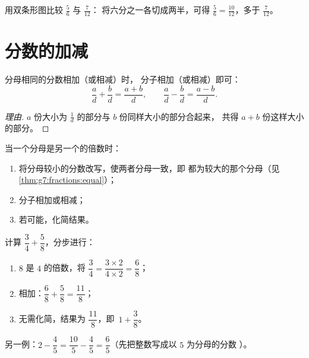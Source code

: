 \begin{omfigure}

{\small 用双条形图比较 $\frac56$ 与 $\frac{7}{12}$：
将六分之一各切成两半，可得 $\frac56 = \frac{10}{12}$，多于
$\frac{7}{12}$。}
\end{omfigure}

\section{分数的加减}

\begin{theorem}[同分母分数的加减]\label{thm:g7:fractions:add}
分母相同的分数相加（或相减）时，
分子相加（或相减）即可：
\[
\frac{a}{d} + \frac{b}{d} = \frac{a + b}{d},
\qquad
\frac{a}{d} - \frac{b}{d} = \frac{a - b}{d} .
\]
\end{theorem}

\begin{proof}[理由]
$a$ 份大小为 $\frac1d$ 的部分与 $b$ 份同样大小的部分合起来，
共得 $a + b$ 份这样大小的部分。
\end{proof}

\begin{method}[分母不同的分数加减]\label{met:g7:fractions:add}
当一个分母是另一个的倍数时：
\begin{enumerate}
  \item 将分母较小的分数改写，使两者分母一致，即
        都为较大的那个分母（见\cref{thm:g7:fractions:equal}）；
  \item 分子相加或相减；
  \item 若可能，化简结果。
\end{enumerate}
\end{method}

\begin{example}\label{ex:g7:fractions:add}
计算 $\dfrac{3}{4} + \dfrac{5}{8}$，分步进行：
\begin{enumerate}
  \item $8$ 是 $4$ 的倍数，将
        $\dfrac34 = \dfrac{3 \times 2}{4 \times 2} = \dfrac{6}{8}$；
  \item 相加：$\dfrac{6}{8} + \dfrac{5}{8} = \dfrac{11}{8}$；
  \item 无需化简，结果为 $\dfrac{11}{8}$，即\
        $1 + \dfrac38$。
\end{enumerate}
另一例：$2 - \dfrac{4}{5} = \dfrac{10}{5} - \dfrac{4}{5} =
\dfrac{6}{5}$（先把整数写成以 $5$ 为分母的分数
）。
\end{example}


